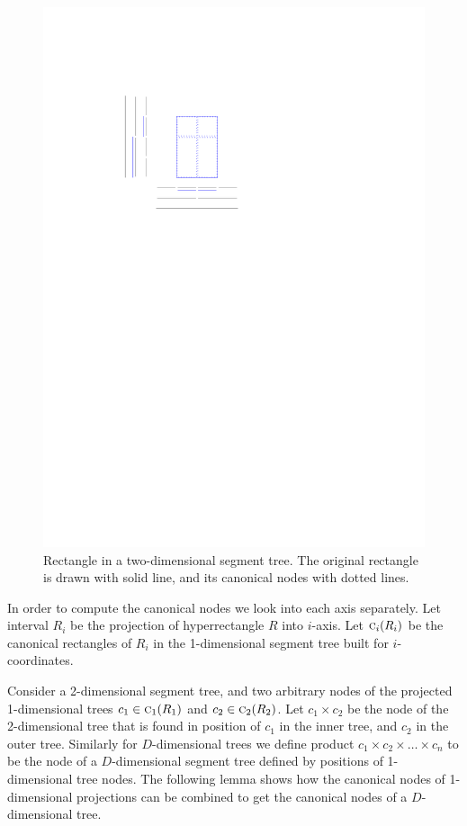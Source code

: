 \documentclass[english,gradu]{tktltiki2018}
\begin{document}
\begin{figure}\centering
	\includegraphics[scale=0.7,page=1]{fig/canon2d}
	\caption{Rectangle in a two-dimensional segment tree. The original rectangle is drawn with solid line, and its canonical nodes with dotted lines.}\label{fig:canon2d}
\end{figure}

In order to compute the canonical nodes we look into each axis separately.
Let interval $R_i$ be the projection of hyperrectangle $R$ into $i$-axis.
Let $\canoni{R_i}{i}$ be the canonical rectangles of $R_i$ in the 1-dimensional segment tree built for $i$-coordinates.

Consider a 2-dimensional segment tree, and two arbitrary nodes of the projected 1-dimensional trees $c_1\in\canoni{R_1}{1}$ and $c_2\in\canoni{R_2}{2}$.
Let $c_1\times c_2$ be the node of the 2-dimensional tree that is found in position of $c_1$ in the inner tree, and $c_2$ in the outer tree.
Similarly for $D$-dimensional trees we define product $c_1\times c_2\times\dots\times c_n$ to be the node of a $D$-dimensional segment tree defined by positions of 1-dimensional tree nodes.
The following lemma shows how the canonical nodes of 1-dimensional projections can be combined to get the canonical nodes of a $D$-dimensional tree.
\end{document}
